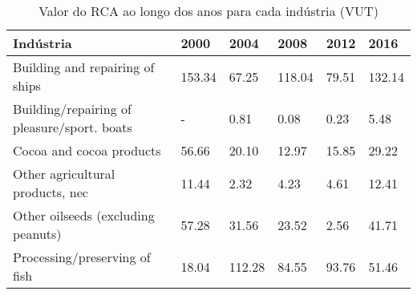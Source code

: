 \begin{table}
\centering
\caption{Valor do RCA ao longo dos anos para cada indústria (VUT)}
\label{tab:ex3-tempo-VUT}
\begin{tabular}{p{6cm}p{1.5cm}p{1.5cm}p{1.5cm}p{1.5cm}p{1.5cm}}
\toprule
                                  Indústria &   2000 &   2004 &   2008 &  2012 &   2016 \\
\midrule
            Building and repairing of ships & 153.34 &  67.25 & 118.04 & 79.51 & 132.14 \\
Building/repairing of pleasure/sport. boats &      - &   0.81 &   0.08 &  0.23 &   5.48 \\
                   Cocoa and cocoa products &  56.66 &  20.10 &  12.97 & 15.85 &  29.22 \\
           Other agricultural products, nec &  11.44 &   2.32 &   4.23 &  4.61 &  12.41 \\
         Other oilseeds (excluding peanuts) &  57.28 &  31.56 &  23.52 &  2.56 &  41.71 \\
              Processing/preserving of fish &  18.04 & 112.28 &  84.55 & 93.76 &  51.46 \\
\bottomrule
\end{tabular}
\end{table}
